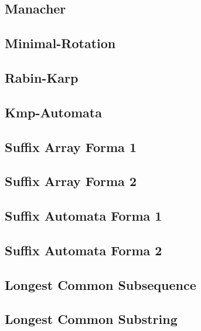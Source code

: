 \subsection{Manacher}
\raggedbottom
\hrulefill
\subsection{Minimal-Rotation}
\raggedbottom
\hrulefill
\subsection{Rabin-Karp}
\raggedbottom
\hrulefill
\subsection{Kmp-Automata}
\raggedbottom
\hrulefill
\subsection{Suffix Array Forma 1}
\raggedbottom
\hrulefill
\subsection{Suffix Array Forma 2}
\raggedbottom
\hrulefill
\subsection{Suffix Automata Forma 1}
\raggedbottom
\hrulefill
\subsection{Suffix Automata Forma 2}
\raggedbottom
\hrulefill
\subsection{Longest Common Subsequence}
\raggedbottom
\hrulefill
\subsection{Longest Common Substring}
\raggedbottom
\hrulefill
